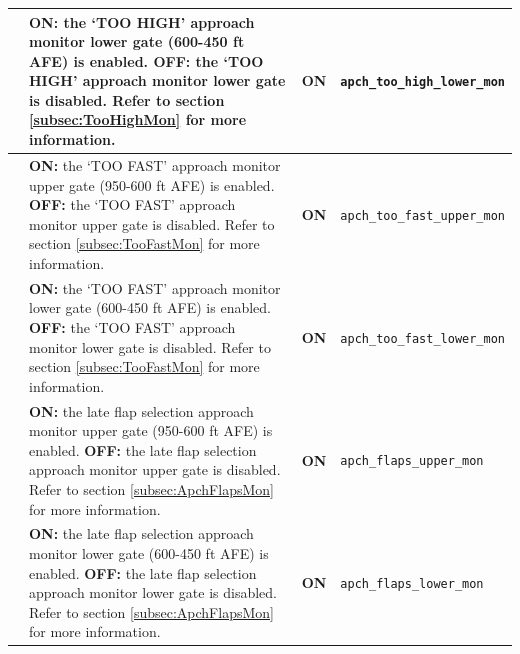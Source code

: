 \documentclass[a4paper,12pt]{article}
\newcommand{\confopt}[1]{\texttt{#1}}
\begin{document}
{\begin{center}
\begin{supertabular}{|c|p{8cm}|c|l|}
\hline

 &
\textbf{ON:} the `TOO HIGH' approach monitor lower gate (600-450 ft AFE)
is enabled.\newline
\textbf{OFF:} the `TOO HIGH' approach monitor lower gate is disabled.\newline
Refer to section \ref{subsec:TooHighMon} for more information. &
\textbf{ON} & \confopt{apch\_too\_high\_lower\_mon} \\

\hline

 &
\textbf{ON:} the `TOO FAST' approach monitor upper gate (950-600 ft AFE)
is enabled.\newline
\textbf{OFF:} the `TOO FAST' approach monitor upper gate is disabled.\newline
Refer to section \ref{subsec:TooFastMon} for more information. &
\textbf{ON} & \confopt{apch\_too\_fast\_upper\_mon} \\

\hline

 &
\textbf{ON:} the `TOO FAST' approach monitor lower gate (600-450 ft AFE)
is enabled.\newline
\textbf{OFF:} the `TOO FAST' approach monitor lower gate is disabled.\newline
Refer to section \ref{subsec:TooFastMon} for more information. &
\textbf{ON} & \confopt{apch\_too\_fast\_lower\_mon} \\

\hline

 &
\textbf{ON:} the late flap selection approach monitor upper gate
(950-600 ft AFE) is enabled.\newline
\textbf{OFF:} the late flap selection approach monitor upper gate is
disabled.\newline
Refer to section \ref{subsec:ApchFlapsMon} for more information. &
\textbf{ON} & \confopt{apch\_flaps\_upper\_mon} \\

\hline

 &
\textbf{ON:} the late flap selection approach monitor lower gate
(600-450 ft AFE) is enabled.\newline
\textbf{OFF:} the late flap selection approach monitor lower gate is
disabled.\newline
Refer to section \ref{subsec:ApchFlapsMon} for more information. &
\textbf{ON} & \confopt{apch\_flaps\_lower\_mon} \\


\end{supertabular}
\end{center}}
\end{document}
